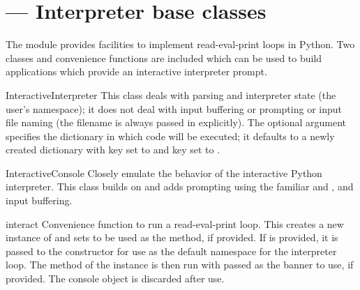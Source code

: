 \section{ ---
         Interpreter base classes}



The  module provides facilities to implement
read-eval-print loops in Python.  Two classes and convenience
functions are included which can be used to build applications which
provide an interactive interpreter prompt.


\begin{classdesc}{InteractiveInterpreter}{}
This class deals with parsing and interpreter state (the user's
namespace); it does not deal with input buffering or prompting or
input file naming (the filename is always passed in explicitly).
The optional  argument specifies the dictionary in
which code will be executed; it defaults to a newly created
dictionary with key  set to 
and key  set to .
\end{classdesc}

\begin{classdesc}{InteractiveConsole}{}
Closely emulate the behavior of the interactive Python interpreter.
This class builds on  and adds
prompting using the familiar  and , and
input buffering.
\end{classdesc}


\begin{funcdesc}{interact}{}
Convenience function to run a read-eval-print loop.  This creates a
new instance of  and sets 
to be used as the  method, if provided.  If
 is provided, it is passed to the
 constructor for use as the default
namespace for the interpreter loop.  The  method
of the instance is then run with  passed as the banner
to use, if provided.  The console object is discarded after use.
\end{funcdesc}

